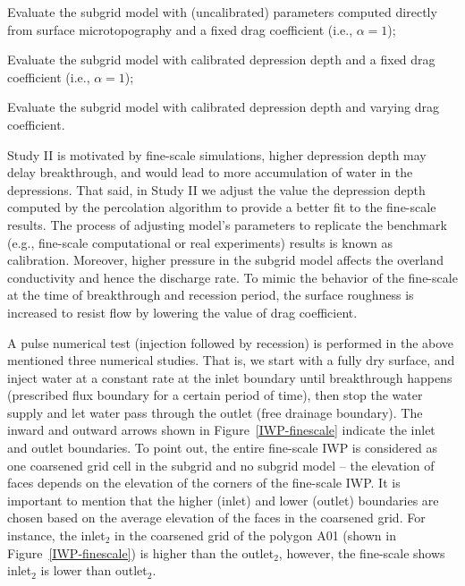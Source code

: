 \documentclass[review,11pt]{elsarticle}
\begin{document}
\begin{description}\itemsep0pt \parskip0pt
\item [Study I:] Evaluate the subgrid model with (uncalibrated) parameters computed directly from surface microtopography and a fixed drag coefficient (i.e., $\alpha =1$);
\item [Study II:] Evaluate the subgrid model with calibrated depression depth and a fixed drag coefficient (i.e., $\alpha =1$);
\item [Study III:] Evaluate the subgrid model with calibrated depression depth and varying drag coefficient.
\end{description}

Study II is motivated by fine-scale simulations, higher depression depth may delay breakthrough, and would lead to more accumulation of water in the depressions. That said, in Study II we adjust the value the depression depth computed by the percolation algorithm to provide a better fit to the fine-scale results. The process of adjusting model's parameters to replicate the benchmark (e.g., fine-scale computational or real experiments) results is known as calibration. Moreover, higher pressure in the subgrid model affects the overland conductivity and hence the discharge rate. To mimic the behavior of the fine-scale at the time of breakthrough and recession period, the surface roughness is increased to resist flow by lowering the value of drag coefficient.

A pulse numerical test (injection followed by recession) is performed in the above mentioned three numerical studies. That is, we start with a fully dry surface, and inject water at a constant rate at the inlet boundary until breakthrough happens (prescribed flux boundary for a certain period of time), then stop the water supply and let water pass through the outlet (free drainage boundary). The inward and outward arrows shown in Figure~\ref{IWP-finescale} indicate the inlet and outlet boundaries. 
To point out, the entire fine-scale IWP is considered as one coarsened grid cell in the subgrid and no subgrid model -- the elevation of faces depends on the elevation of the corners of the fine-scale IWP.  It is important to mention that the higher (inlet) and lower (outlet) boundaries are chosen based on the average elevation of the faces in the coarsened grid. For instance, the inlet$_2$ in the coarsened grid of the polygon A01 (shown in Figure~\ref{IWP-finescale}) is higher than the outlet$_2$, however, the fine-scale shows inlet$_2$ is lower than outlet$_2$. 
\end{document}
